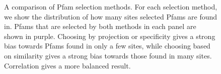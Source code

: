 \begin{figure}[!ht]
\centering
 \caption{A comparison of Pfam selection methods.  For each selection method, we show the distribution of how many sites selected Pfams are found in.  Pfams that are selected by both methods in each panel are shown in purple.  Choosing by projection or specificity gives a strong bias towards Pfams found in only a few sites, while choosing based on similarity gives a strong bias towards those found in many sites.  Correlation gives a more balanced result.}
 \label{sitedist}
\end{figure}

